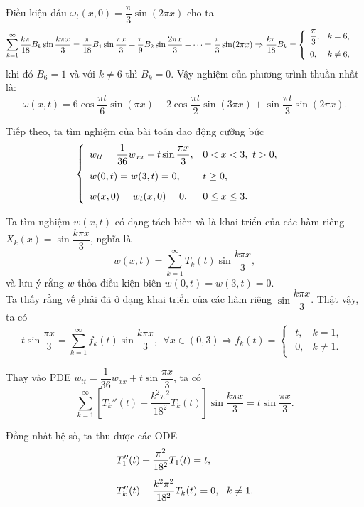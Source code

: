 \documentclass[10pt, a4paper]{article}
\begin{document}
	Điều kiện đầu $\omega_t(x,0)=\dfrac\pi3\sin(2\pi x)$ cho ta $$\sum_{k=1}^\infty\frac{k\pi}{18}B_k\sin\frac{k\pi x}{3}=\frac{\pi}{18}B_1\sin\frac{\pi x}{3}+\frac\pi9B_2\sin\frac{2\pi x}{3}+\cdots=\dfrac\pi3\sin(2\pi x)\Rightarrow\frac{k\pi}{18}B_k=\begin{cases}
		\begin{array}{ll}
			\dfrac\pi3, & k=6, \\
			\noalign{\vskip5pt}
			0, & k\ne6,
		\end{array}
	\end{cases}$$
	khi đó $B_6=1$ và với $k\ne6$ thì $B_k=0$. Vậy nghiệm của phương trình thuần nhất là: $$\omega(x,t)=6\cos\frac{\pi t}{6}\sin(\pi x)-2\cos\frac{\pi t}{2}\sin(3\pi x)+\sin\frac{\pi t}{3}\sin(2\pi x).$$
	
	Tiếp theo, ta tìm nghiệm của bài toán dao động cưỡng bức $$\begin{cases}
		\begin{array}{ll}
			w_{tt}=\dfrac{1}{36}w_{xx}+t\sin\dfrac{\pi x}{3}, & 0<x<3,~t>0, \\
			\noalign{\vskip5pt}
			w(0,t)=w(3,t)=0, & t\ge0, \\
			\noalign{\vskip6pt}
			w(x,0)=w_t(x,0)=0, & 0\le x\le3.
		\end{array}
	\end{cases}$$
	
	Ta tìm nghiệm $w(x,t)$ có dạng tách biến và là khai triển của các hàm riêng $X_k(x)=\sin\dfrac{k\pi x}{3}$, nghĩa là $$w(x,t)=\sum_{k=1}^\infty T_k(t)\sin\frac{k\pi x}{3},$$
	và lưu ý rằng $w$ thỏa điều kiện biên $w(0,t)=w(3,t)=0$.\\
	
	Ta thấy rằng vế phải đã ở dạng khai triển của các hàm riêng $\sin\dfrac{k\pi x}{3}$. Thật vậy, ta có $$t\sin\frac{\pi x}{3}=\sum_{k=1}^\infty f_k(t)\sin\frac{k\pi x}{3},~~\forall x\in(0,3)\Rightarrow f_k(t)=\begin{cases}
		\begin{array}{ll}
			t, & k=1, \\
			0, & k\ne1.
		\end{array}
	\end{cases}$$
	
	Thay vào PDE $w_{tt}=\dfrac{1}{36}w_{xx}+t\sin\dfrac{\pi x}{3}$, ta có $$\sum_{k=1}^\infty\left[T_k''(t)+\frac{k^2\pi^2}{18^2}T_k(t)\right]\sin\frac{k\pi x}{3}=t\sin\dfrac{\pi x}{3}.$$
	
	Đồng nhất hệ số, ta thu được các ODE \begin{align*}
		&T_1''(t)+\frac{\pi^2}{18^2}T_1(t)=t,\\
		\noalign{\vskip5pt}
		&T_k''(t)+\frac{k^2\pi^2}{18^2}T_k(t)=0,~~k\ne1.
	\end{align*}
	
\end{document}

